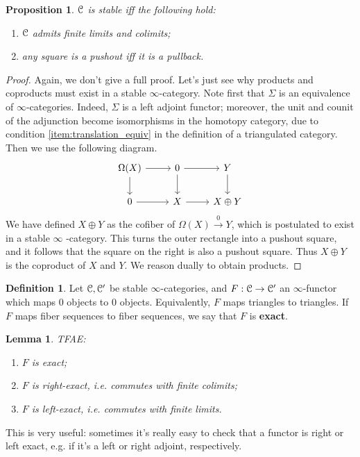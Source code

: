 \documentclass[10pt,a4paper,reqno,oneside]{book} %
\theoremstyle{plain}
\newtheorem{lem}[thm]{Lemma}
\newtheorem{prop}[thm]{Proposition}
\theoremstyle{definition}
\newtheorem{defin}[thm]{Definition}
\theoremstyle{remark}
\numberwithin{equation}{section}
\begin{document}
\begin{prop}
$\mathcal C$ is stable iff the following hold:
\begin{enumerate}
\item $\mathcal C$ admits finite limits and colimits;
\item any square is a pushout iff it is a pullback.
\end{enumerate}
\end{prop}
\begin{proof}
Again, we don't give a full proof. Let's just see why products and coproducts must exist in a stable $\infty$-category. 
Note first that $\Sigma$ is an equivalence of
$\infty$-categories. Indeed, $\Sigma$ is a left adjoint functor; moreover, the unit and counit of the adjunction become 
isomorphisms in the homotopy category, due to condition \ref{item:translation_equiv} in the definition of a triangulated
category. Then we use the following diagram.
\[
\begin{tikzcd}
\Omega(X)\arrow{d}\arrow{r} & 0\arrow{d}\arrow{r} & Y\arrow{d} \\
0\arrow{r} & X\arrow{r} & X \oplus Y
\end{tikzcd}
\]
We have defined $X \oplus Y$ as the cofiber of $\Omega(X) \overset{0}{\to} Y$, which is postulated to exist in a stable $\infty$
-category. This turns the outer rectangle into a pushout square, and it follows that the square on the right is also a pushout
square. Thus $X\oplus Y$ is the coproduct of $X$ and $Y$. We reason dually to obtain products.
\end{proof}

\begin{defin}
Let $\mathcal C, \mathcal C'$ be stable $\infty$-categories, and $F: \mathcal C \to \mathcal C'$ an $\infty$-functor which maps 0 objects to 0 objects. 
Equivalently, $F$ maps triangles to triangles.
If $F$ maps fiber sequences to fiber sequences, we say that $F$ is \textbf{exact}.
\end{defin}

\begin{lem}
\label{lem:exact}
TFAE:
\begin{enumerate}
\item $F$ is exact;
\item $F$ is right-exact, i.e. commutes with finite colimits;
\item $F$ is left-exact, i.e. commutes with finite limits.
\end{enumerate}
\end{lem}

This is very useful: sometimes it's really easy to check that a functor is right or left exact, e.g. if it's a left or right
adjoint, respectively.
\end{document}
